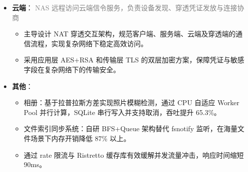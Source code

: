 \documentclass{resume}
\begin{document}
\begin{itemize}
     \item \textbf{云端}：
    {\small
    \noindent\textcolor{gray}{NAS 远程访问云端信令服务，负责设备发现、穿透凭证发放与连接协商}
    }
    \vspace{0.2ex}
    \begin{itemize}
        \item 主导设计 NAT 穿透交互架构，规范客户端、服务端、云端及穿透端的通信流程，实现复杂网络下稳定高效访问。
        \item 采用应用层 AES+RSA 和传输层 TLS 的双层加密方案，保障凭证与敏感字段在复杂网络下的传输安全。
    \end{itemize}
    \vspace{1ex}
    
    \item \textbf{其他}：
    \begin{itemize}
        \item 相册：基于拉普拉斯方差实现照片模糊检测，通过 CPU 自适应 Worker Pool 并行计算，SQLite 串行写入并支持取消，吞吐提升 65.3\%。
        \item 文件索引同步系统：自研 BFS+Queue 架构替代 fsnotify 监听，在海量文件场景下内存开销降低 87\% 以上。
        \item 通过 rate 限流与 Ristretto 缓存库有效缓解并发流量冲击，响应时间缩短 90ms。
    \end{itemize}

\end{itemize}
\end{document}
